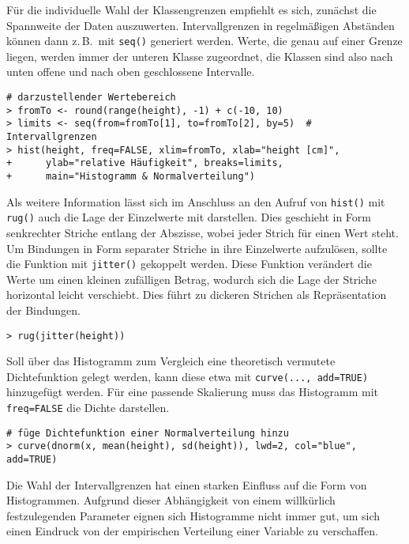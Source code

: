 Für die individuelle Wahl der Klassengrenzen empfiehlt es sich, zunächst die Spannweite der Daten auszuwerten. Intervallgrenzen in regelmäßigen Abständen können dann z.\,B.\ mit \lstinline!seq()! generiert werden. Werte, die genau auf einer Grenze liegen, werden immer der unteren Klasse zugeordnet, die Klassen sind also nach unten offene und nach oben geschlossene Intervalle.
\begin{lstlisting}
# darzustellender Wertebereich
> fromTo <- round(range(height), -1) + c(-10, 10)
> limits <- seq(from=fromTo[1], to=fromTo[2], by=5)  # Intervallgrenzen
> hist(height, freq=FALSE, xlim=fromTo, xlab="height [cm]",
+      ylab="relative Häufigkeit", breaks=limits,
+      main="Histogramm & Normalverteilung")
\end{lstlisting}

Als weitere Information lässt sich im Anschluss an den Aufruf von \lstinline!hist()! mit \lstinline!rug()! auch die Lage der Einzelwerte mit darstellen. Dies geschieht in Form senkrechter Striche entlang der Abszisse, wobei jeder Strich für einen Wert steht. Um Bindungen in Form separater Striche in ihre Einzelwerte aufzulösen, sollte die Funktion mit \lstinline!jitter()! gekoppelt werden. Diese Funktion verändert die Werte um einen kleinen zufälligen Betrag, wodurch sich die Lage der Striche horizontal leicht verschiebt. Dies führt zu dickeren Strichen als Repräsentation der Bindungen.
\begin{lstlisting}
> rug(jitter(height))
\end{lstlisting}

Soll über das Histogramm zum Vergleich eine theoretisch vermutete Dichtefunktion gelegt werden, kann diese etwa mit \lstinline!curve(..., add=TRUE)! hinzugefügt werden. Für eine passende Skalierung muss das Histogramm mit \lstinline!freq=FALSE! die Dichte darstellen.
\begin{lstlisting}
# füge Dichtefunktion einer Normalverteilung hinzu
> curve(dnorm(x, mean(height), sd(height)), lwd=2, col="blue", add=TRUE)
\end{lstlisting}

Die Wahl der Intervallgrenzen hat einen starken Einfluss auf die Form von Histogrammen. Aufgrund dieser Abhängigkeit von einem willkürlich festzulegenden Parameter eignen sich Histogramme nicht immer gut, um sich einen Eindruck von der empirischen Verteilung einer Variable zu verschaffen.

